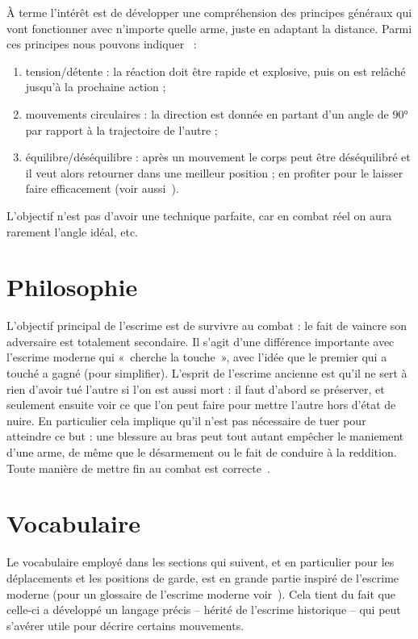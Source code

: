 À terme l'intérêt est de développer une compréhension des principes généraux qui vont fonctionner avec n'importe quelle arme, juste en adaptant la distance.
Parmi ces principes nous pouvons indiquer~\cite{enzi:dijon:messer_inner:2015} :
\begin{enumerate}
	\item tension/détente : la réaction doit être rapide et explosive, puis on est relâché jusqu'à la prochaine action ;
	\item mouvements circulaires : la direction est donnée en partant d'un angle de \ang{90} par rapport à la trajectoire de l'autre ;
	\item équilibre/déséquilibre : après un mouvement le corps peut être déséquilibré et il veut alors retourner dans une meilleur position ; en profiter pour le laisser faire efficacement (voir aussi~\cite{guidoux:dijon:thibault:2015}).
\end{enumerate}
L'objectif n'est pas d'avoir une technique parfaite, car en combat réel on aura rarement l'angle idéal, etc.


\section{Philosophie}


L'objectif principal de l'escrime est de survivre au combat : le fait de vaincre son adversaire est totalement secondaire.
Il s'agit d'une différence importante avec l'escrime moderne qui « cherche la touche », avec l'idée que le premier qui a touché a gagné (pour simplifier).
L'esprit de l'escrime ancienne est qu'il ne sert à rien d'avoir tué l'autre si l'on est aussi mort : il faut d'abord se préserver, et seulement ensuite voir ce que l'on peut faire pour mettre l'autre hors d'état de nuire.
En particulier cela implique qu'il n'est pas nécessaire de tuer pour atteindre ce but : une blessure au bras peut tout autant empêcher le maniement d'une arme, de même que le désarmement ou le fait de conduire à la reddition.
Toute manière de mettre fin au combat est correcte~\footnotemark{}.


\section{Vocabulaire}


Le vocabulaire employé dans les sections qui suivent, et en particulier pour les déplacements et les positions de garde, est en grande partie inspiré de l'escrime moderne (pour un glossaire de l'escrime moderne voir~\cite{FIE:2014:BrefsGlossairesLescrime}).
Cela tient du fait que celle-ci a développé un langage précis -- hérité de l'escrime historique -- qui peut s'avérer utile pour décrire certains mouvements.
